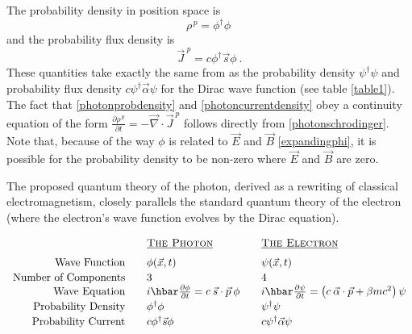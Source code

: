 \documentclass[12pt,secnumarabic,amsmath,amssymb,balancelastpage,nofootinbib]{article}
\newcommand{\del}[0]{\ensuremath{\vec{\nabla}}}
\begin{document}
The probability density in position space is
\begin{equation}
\rho^{\,p}=\phi^\dagger \phi
\ 
\label{photonprobdensity}
\end{equation}
and the probability flux density is
\begin{equation}
\vec{J}^{\:p}=c \phi^\dagger \vec{s} \phi
\ .
\label{photoncurrentdensity}
\end{equation}
These quantities take exactly the same from as the probability density $\psi^\dagger \psi$ and probability flux density $c \psi^\dagger \vec{\alpha} \psi$ for the Dirac wave function (see table \ref{table1}).  The fact that \eqref{photonprobdensity} and \eqref{photoncurrentdensity} obey a continuity equation of the form $\frac{\partial \rho^{\,p}}{\partial t}=-\del\cdot\vec{J}^{\:p}$ follows directly from \eqref{photonschrodinger}.  Note that, because of the way $\phi$ is related to $\vec{E}$ and $\vec{B}$ \eqref{expandingphi}, it is possible for the probability density to be non-zero where $\vec{E}$ and $\vec{B}$ are zero.

\begin{table}[h!]
\centering
\caption{The proposed quantum theory of the photon, derived as a rewriting of classical electromagnetism, closely parallels the standard quantum theory of the electron (where the electron's wave function evolves by the Dirac equation).}
\begin{align}
\begin{array}{rll}
 &\mbox{\sc \underline{The Photon}} & \mbox{\sc \underline{The Electron}}
\nonumber
\vspace*{6 pt}
\\
\mbox{Wave Function}\quad&\phi(\vec{x},t)&\psi(\vec{x},t)
\vspace*{2 pt}
\nonumber
\\
\mbox{Number of Components}\quad&3&4
\nonumber
\\
\mbox{Wave Equation}\quad&i\hbar\frac{\partial \phi}{\partial t}  = c \: \vec{s}\cdot \vec{p}\: \phi \quad&i\hbar \frac{\partial \psi}{\partial t}=\left(c\:\vec{\alpha}\cdot\vec{p}+\beta m c^2 \right)\psi
\vspace*{2 pt}
\nonumber
\\
\mbox{Probability Density}\quad&\phi^\dagger \phi&\psi^\dagger \psi
\vspace*{2 pt}
\nonumber
\\
\mbox{Probability Current}\quad&c \phi^\dagger \vec{s} \phi&c \psi^\dagger \vec{\alpha} \psi
\end{array}
\nonumber
\end{align}
\label{table1}
\end{table}
\end{document}
